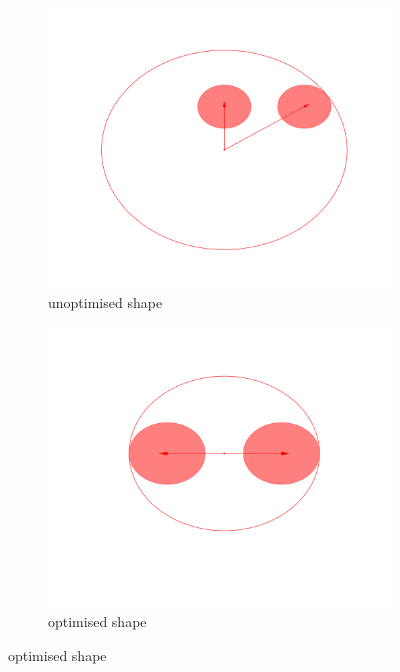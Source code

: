 \documentclass[12pt, oneside]{report}
\begin{document}
\begin{figure}
  \centering

  \begin{subfigure}[b]{0.4\linewidth}
    \includegraphics[width=\linewidth,height=\linewidth]{Images/Auxillaries/unoptimised_fig.pdf}
    \caption{unoptimised shape}
  \end{subfigure}
  \begin{subfigure}[b]{0.4\linewidth}
    \includegraphics[width=\linewidth,height=\linewidth]{Images/Auxillaries/optimised_fig.pdf}
    \caption{optimised shape}
  \end{subfigure}



\end{figure}
\end{document}
